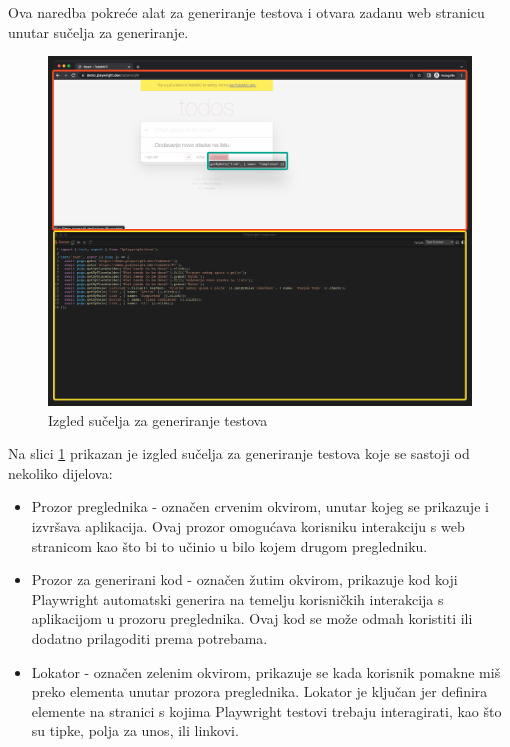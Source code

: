 Ova naredba pokreće alat za generiranje testova i otvara zadanu web stranicu unutar sučelja za generiranje.
\begin{figure}[!h]\begin{center}
  \includegraphics[width=1\textwidth]{"img/codegenInterface"}
  \caption{Izgled sučelja za generiranje testova}\label{img:pwCodeGen}
\end{center}\end{figure}
Na slici \ref{img:pwCodeGen} prikazan je izgled sučelja za generiranje testova koje se sastoji od nekoliko dijelova:

\begin{itemize}
\item Prozor preglednika - označen crvenim okvirom, unutar kojeg se prikazuje i izvršava aplikacija.
Ovaj prozor omogućava korisniku interakciju s web stranicom kao što bi to učinio u bilo kojem drugom pregledniku.
\item Prozor za generirani kod - označen žutim okvirom, prikazuje kod koji Playwright automatski generira na temelju korisničkih interakcija s aplikacijom u prozoru preglednika.
Ovaj kod se može odmah koristiti ili dodatno prilagoditi prema potrebama.
\item Lokator - označen zelenim okvirom, prikazuje se kada korisnik pomakne miš preko elementa unutar prozora preglednika.
Lokator je ključan jer definira elemente na stranici s kojima Playwright testovi trebaju interagirati, kao što su tipke, polja za unos, ili linkovi.
\end{itemize}

